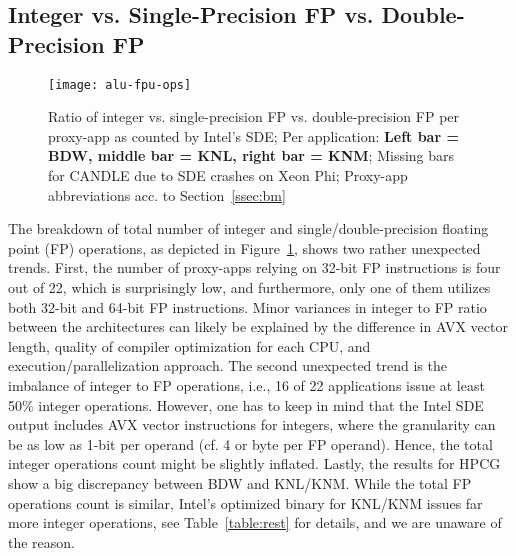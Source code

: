 \subsection{Integer vs. Single-Precision FP vs. Double-Precision FP}\label{ssec:eval_ops}
%
\begin{figure}[tbp]
    \centering
    \texttt{[image: alu-fpu-ops]}
    \caption{\label{fig:totalops} Ratio of integer vs. single-precision FP vs. double-precision FP per proxy-app as counted by Intel's SDE; Per application: \textbf{Left bar = BDW, middle bar = KNL, right bar = KNM}; Missing bars for CANDLE due to SDE crashes on Xeon Phi; Proxy-app abbreviations acc. to Section~\ref{ssec:bm}}
    \vspace{-0.6em}
\end{figure}
%
The breakdown of total number of integer and single/double-precision floating point (FP) operations, as depicted in Figure~\ref{fig:totalops},
shows two rather unexpected trends. First, the number of proxy-apps relying on 32-bit FP instructions is four out of 22, which is surprisingly low, and furthermore, only one of them utilizes both 32-bit and 64-bit FP instructions.
Minor variances in integer to FP ratio between the architectures can likely be explained by the difference in
AVX vector length, quality of compiler optimization for each CPU, and execution/parallelization approach.
The second unexpected trend is the imbalance of integer to FP operations, i.e., 16 of 22 applications issue at least 50\%
integer operations. However, one has to keep in mind that the Intel SDE output includes AVX vector instructions for integers, where
the granularity can be as low as 1-bit per operand (cf. 4 or \unit[8]{byte} per FP operand). Hence, the total integer operations
count might be slightly inflated.
Lastly, the results for HPCG show a big discrepancy between BDW and KNL/KNM. While the total FP operations count is similar,
Intel's optimized binary for KNL/KNM issues far more integer operations, see Table~\ref{table:rest} for details, and we are unaware of the reason.

